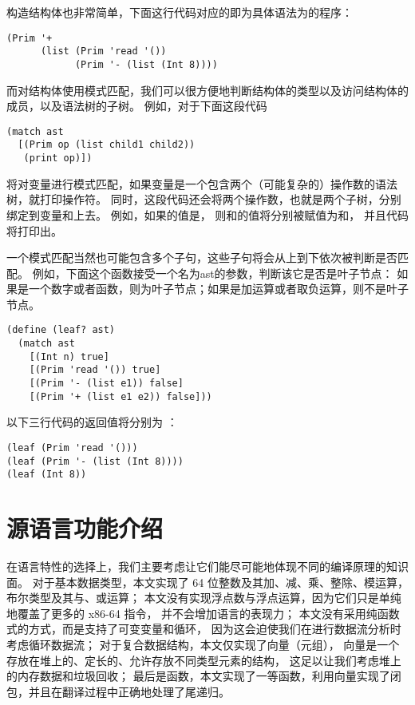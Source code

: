 构造结构体也非常简单，下面这行代码对应的即为具体语法为的程序：
\begin{lstlisting}
(Prim '+
      (list (Prim 'read '())
            (Prim '- (list (Int 8))))
\end{lstlisting}

而对结构体使用模式匹配，我们可以很方便地判断结构体的类型以及访问结构体的成员，以及语法树的子树。
例如，对于下面这段代码
\begin{lstlisting}
(match ast
  [(Prim op (list child1 child2))
   (print op)])
\end{lstlisting}
将对变量进行模式匹配，如果变量是一个包含两个（可能复杂的）操作数的语法树，就打印操作符。
同时，这段代码还会将两个操作数，也就是两个子树，分别绑定到变量和上去。
例如，如果的值是，
则和的值将分别被赋值为和，
并且代码将打印出\code{+}。

一个模式匹配当然也可能包含多个子句，这些子句将会从上到下依次被判断是否匹配。
例如，下面这个函数接受一个名为ast的参数，判断该它是否是叶子节点：
如果是一个数字或者函数，则为叶子节点；如果是加运算或者取负运算，则不是叶子节点。
\begin{lstlisting}
(define (leaf? ast)
  (match ast
    [(Int n) true]
    [(Prim 'read '()) true]
    [(Prim '- (list e1)) false]
    [(Prim '+ (list e1 e2)) false]))
\end{lstlisting}

以下三行代码的返回值将分别为 ：
\begin{lstlisting}
(leaf (Prim 'read '()))
(leaf (Prim '- (list (Int 8))))
(leaf (Int 8))
\end{lstlisting}

\section{源语言功能介绍}

在语言特性的选择上，我们主要考虑让它们能尽可能地体现不同的编译原理的知识面。
对于基本数据类型，本文实现了 64 位整数及其加、减、乘、整除、模运算，布尔类型及其与、或运算；
本文没有实现浮点数与浮点运算，因为它们只是单纯地覆盖了更多的 x86-64 指令，
并不会增加语言的表现力；
本文没有采用纯函数式的方式，而是支持了可变变量和循环，
因为这会迫使我们在进行数据流分析时考虑循环数据流；
对于复合数据结构，本文仅实现了向量（元组），
向量是一个存放在堆上的、定长的、允许存放不同类型元素的结构，
这足以让我们考虑堆上的内存数据和垃圾回收；
最后是函数，本文实现了一等函数，利用向量实现了闭包，并且在翻译过程中正确地处理了尾递归。

